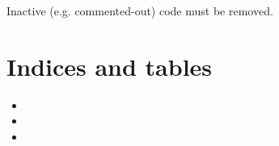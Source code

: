 \documentclass[letterpaper,10pt,english]{sphinxmanual}
\begin{document}
Inactive (e.g. commented-out) code must be removed.


\chapter{Indices and tables}
\label{\detokenize{index:indices-and-tables}}\begin{itemize}
\item {} 

\item {} 

\item {} 

\end{itemize}



\renewcommand{\indexname}{Index}
\printindex
\end{document}
